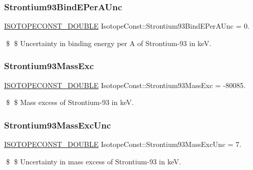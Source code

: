 \subsubsection{\texorpdfstring{Strontium93\+Bind\+E\+Per\+A\+Unc}{Strontium93BindEPerAUnc}}
{\footnotesize\ttfamily \mbox{\hyperlink{group___isotope_const-_macros_ga8f45a7272ce02c0b4c65c44636ed719a}{I\+S\+O\+T\+O\+P\+E\+C\+O\+N\+S\+T\+\_\+\+D\+O\+U\+B\+LE}} Isotope\+Const\+::\+Strontium93\+Bind\+E\+Per\+A\+Unc = 0.}

\$ \$ Uncertainty in binding energy per A of Strontium-\/93 in keV. \mbox{\label{group___isotope_const-_strontium-_sr93_ga0d41a00eacf86550400da168be02f795}} 
\subsubsection{\texorpdfstring{Strontium93\+Mass\+Exc}{Strontium93MassExc}}
{\footnotesize\ttfamily \mbox{\hyperlink{group___isotope_const-_macros_ga8f45a7272ce02c0b4c65c44636ed719a}{I\+S\+O\+T\+O\+P\+E\+C\+O\+N\+S\+T\+\_\+\+D\+O\+U\+B\+LE}} Isotope\+Const\+::\+Strontium93\+Mass\+Exc = -\/80085.}

\$ \$ Mass excess of Strontium-\/93 in keV. \mbox{\label{group___isotope_const-_strontium-_sr93_gad794a3015498bd2a497a6abfc6089e45}} 
\subsubsection{\texorpdfstring{Strontium93\+Mass\+Exc\+Unc}{Strontium93MassExcUnc}}
{\footnotesize\ttfamily \mbox{\hyperlink{group___isotope_const-_macros_ga8f45a7272ce02c0b4c65c44636ed719a}{I\+S\+O\+T\+O\+P\+E\+C\+O\+N\+S\+T\+\_\+\+D\+O\+U\+B\+LE}} Isotope\+Const\+::\+Strontium93\+Mass\+Exc\+Unc = 7.}

\$ \$ Uncertainty in mass excess of Strontium-\/93 in keV. \mbox{\label{group___isotope_const-_strontium-_sr93_gab1ecd561a48b1cc517aea46259ed43c8}} 
